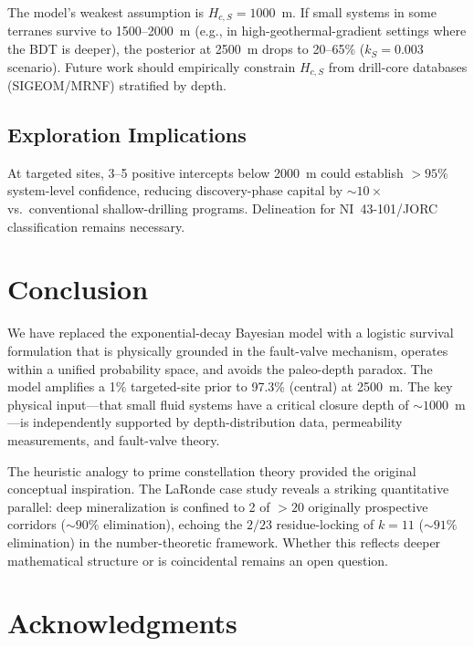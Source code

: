 \documentclass[11pt,a4paper]{article}
\begin{document}
The model's weakest assumption is $H_{c,S} = 1000$~m.
If small systems in some terranes survive to 1500--2000~m (e.g., in high-geothermal-gradient settings where the BDT is deeper), the posterior at 2500~m drops to 20--65\% ($k_S = 0.003$ scenario).
Future work should empirically constrain $H_{c,S}$ from drill-core databases (SIGEOM/MRNF) stratified by depth.

\subsection{Exploration Implications}

At targeted sites, 3--5 positive intercepts below 2000~m could establish ${>}95\%$ system-level confidence, reducing discovery-phase capital by ${\sim}10\times$ vs.\ conventional shallow-drilling programs.
Delineation for NI~43-101/JORC classification remains necessary.

\section{Conclusion}

We have replaced the exponential-decay Bayesian model with a logistic survival formulation that is physically grounded in the fault-valve mechanism, operates within a unified probability space, and avoids the paleo-depth paradox.
The model amplifies a 1\% targeted-site prior to 97.3\% (central) at 2500~m.
The key physical input---that small fluid systems have a critical closure depth of ${\sim}1000$~m---is independently supported by depth-distribution data, permeability measurements, and fault-valve theory.

The heuristic analogy to prime constellation theory \cite{Chen2026a} provided the original conceptual inspiration.
The LaRonde case study reveals a striking quantitative parallel: deep mineralization is confined to 2 of ${>}20$ originally prospective corridors (${\sim}90\%$ elimination), echoing the $2/23$ residue-locking of $k = 11$ (${\sim}91\%$ elimination) in the number-theoretic framework.
Whether this reflects deeper mathematical structure or is coincidental remains an open question.

\section*{Acknowledgments}
\end{document}
